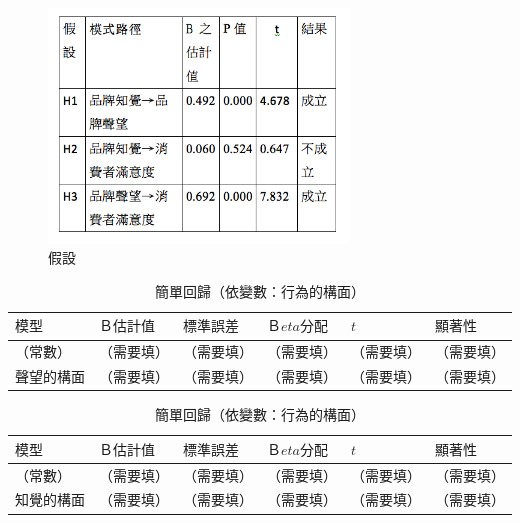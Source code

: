 \begin{figure}[!t]
\centering
\includegraphics[width=8cm]{images/H.PNG}
\caption{假設}
\label{fig:p7}
\end{figure}

\begin{table}[htb]
\caption{簡單回歸（依變數：行為的構面）}
\label{tab:r01}
\renewcommand{\arraystretch}{1.2} %
\arrayrulewidth=1pt               %
\tabcolsep=6pt                   %
\begin{tabular}[t]{llllll}  %
\hline
 $模型$&$Ｂ估計值$&$標準誤差$& $Ｂeta分配$& $t$& $顯著性$ \\
\hline
（常數）&（需要填）&（需要填）&（需要填）&（需要填）&（需要填）\\
聲望的構面&（需要填）&（需要填）&（需要填）&（需要填）&（需要填）\\
\hline
\end{tabular}
\end{table}

\begin{table}[htb]
\caption{簡單回歸（依變數：行為的構面）}
\label{tab:r02}
\renewcommand{\arraystretch}{1.2} %
\arrayrulewidth=1pt               %
\tabcolsep=6pt                   %
\begin{tabular}[t]{llllll}  %
\hline
 $模型$&$Ｂ估計值$&$標準誤差$& $Ｂeta分配$& $t$& $顯著性$ \\
\hline
（常數）&（需要填）&（需要填）&（需要填）&（需要填）&（需要填）\\
知覺的構面&（需要填）&（需要填）&（需要填）&（需要填）&（需要填）\\
\hline
\end{tabular}
\end{table}

